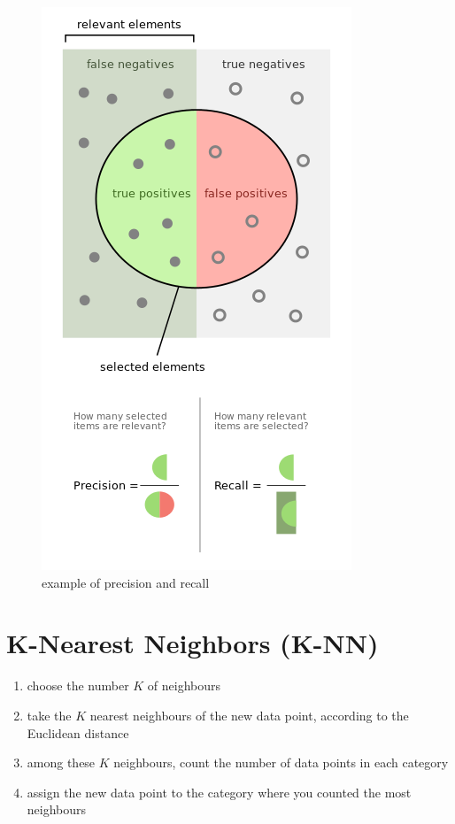 \begin{figure}
	\includegraphics[width=\linewidth]{./figures/precision_recall.png}
	\centering
	\caption{example of precision and recall}
\end{figure}

\section{K-Nearest Neighbors (K-NN)}
\begin{enumerate}
	\item choose the number $K$ of neighbours
	\item take the $K$ nearest neighbours of the new data point, according to the Euclidean distance
	\item among these $K$ neighbours, count the number of data points in each category
	\item assign the new data point to the category where you counted the most neighbours
\end{enumerate}
